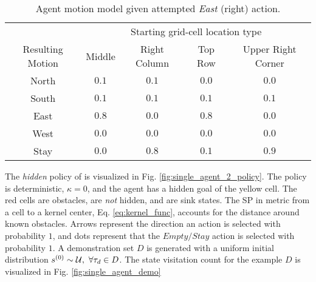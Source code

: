     \begin{table}[h!]
        \centering
        \begin{tabular}{ c || c | c | c | c}
                & \multicolumn{4}{c}{Starting grid-cell location type}\\
                Resulting Motion & Middle & Right Column & Top Row & Upper Right Corner\\
                \hline
                North & $0.1$ & $0.1$ & $0.0$ & $0.0$ \\
                South & $0.1$ & $0.1$ & $0.1$ & $0.1$ \\
                East  & $0.8$ & $0.0$ & $0.8$ & $0.0$ \\
                West  & $0.0$ & $0.0$ & $0.0$ & $0.0$ \\
                Stay  & $0.0$ & $0.8$ & $0.1$ & $0.9$ \\
        \end{tabular}
        \label{table:motion_model}
        \caption{Agent motion model given attempted \textit{East} (right) action.}
    \end{table}

    The \textit{hidden} policy of  is visualized in Fig. \ref{fig:single_agent_2_policy}. The policy is
    deterministic, $\kappa=0$, and the agent has a hidden goal of the yellow cell. The red cells are obstacles, are
    \textit{not} hidden, and are sink states. The \acf{SP} in metric from a cell to a kernel center, Eq.
    \ref{eq:kernel_func}, accounts for the distance around known obstacles. Arrows represent the direction an action is
    selected with probability $1$, and dots represent that the $Empty/Stay$ action is selected with probability $1$. A
    demonstration set $D$ is generated with a uniform initial distribution $s^{(0)} \sim \mathcal{U},\ \forall \tau_d
    \in D$. The state visitation count for the example $D$ is visualized in Fig. \ref{fig:single_agent_demo}

    \begin{figure}[htb]
        \begin{center}
        \end{center}
    \end{figure}


